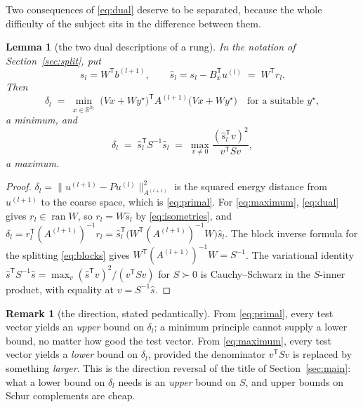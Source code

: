 \documentclass[11pt,a4paper]{article}
\theoremstyle{plain}
\newtheorem{lemma}[theorem]{Lemma}
\theoremstyle{definition}
\newtheorem{remark}[theorem]{Remark}
\newcommand{\R}{\mathbb{R}}
\newcommand{\T}{\mathsf{T}}
\newcommand{\ran}{\operatorname{ran}}
\newcommand{\shat}{\widehat{s}}
\newcommand{\PD}{\succ 0}
\begin{document}
Two consequences of \eqref{eq:dual} deserve to be separated, because the whole
difficulty of the subject sits in the difference between them.

\begin{lemma}[the two dual descriptions of a rung]
\label{lem:twoforms}
In the notation of Section~\ref{sec:split}, put
\begin{equation}
\label{eq:shat}
  s_{l}=W^{\T}b^{(l+1)},\qquad
  \shat_{l}=s_{l}-B_{x}^{\T}u^{(l)}\;=\;W^{\T}r_{l} .
\end{equation}
Then
\begin{equation}
\label{eq:primal}
  \delta_{l}
  \;=\;\min_{x\in\R^{h_{l}}}\;
    \bigl(Vx+W y^{\star}\bigr)^{\T}A^{(l+1)}\bigl(Vx+Wy^{\star}\bigr)
  \quad\text{for a suitable }y^{\star},
\end{equation}
a \emph{minimum}, and
\begin{equation}
\label{eq:maximum}
  \delta_{l}
  \;=\;\shat_{l}^{\T}S^{-1}\shat_{l}
  \;=\;\max_{v\neq0}\frac{(\shat_{l}^{\T}v)^{2}}{v^{\T}Sv},
\end{equation}
a \emph{maximum}.
\end{lemma}

\begin{proof}
$\delta_{l}=\|u^{(l+1)}-Pu^{(l)}\|^{2}_{A^{(l+1)}}$ is the squared energy distance
from $u^{(l+1)}$ to the coarse space, which is \eqref{eq:primal}. For
\eqref{eq:maximum}, \eqref{eq:dual} gives $r_{l}\in\ran W$, so $r_{l}=W\shat_{l}$ by
\eqref{eq:isometries}, and
$\delta_{l}=r_{l}^{\T}(A^{(l+1)})^{-1}r_{l}
=\shat_{l}^{\T}\bigl(W^{\T}(A^{(l+1)})^{-1}W\bigr)\shat_{l}$.
The block inverse formula for the splitting \eqref{eq:blocks} gives
$W^{\T}(A^{(l+1)})^{-1}W=S^{-1}$. The variational identity
$\shat^{\T}S^{-1}\shat=\max_{v}(\shat^{\T}v)^{2}/(v^{\T}Sv)$ for $S\PD$ is
Cauchy--Schwarz in the $S$-inner product, with equality at $v=S^{-1}\shat$.
\end{proof}

\begin{remark}[the direction, stated pedantically]
\label{rem:direction}
From \eqref{eq:primal}, every test vector yields an \emph{upper} bound on
$\delta_{l}$; a minimum principle cannot supply a lower bound, no matter how good the
test vector. From \eqref{eq:maximum}, every test vector yields a \emph{lower} bound
on $\delta_{l}$, provided the denominator $v^{\T}Sv$ is replaced by something
\emph{larger}. This is the direction reversal of the title of
Section~\ref{sec:main}: what a lower bound on $\delta_{l}$ needs is an
\emph{upper} bound on $S$, and upper bounds on Schur complements are cheap.
\end{remark}
\end{document}
